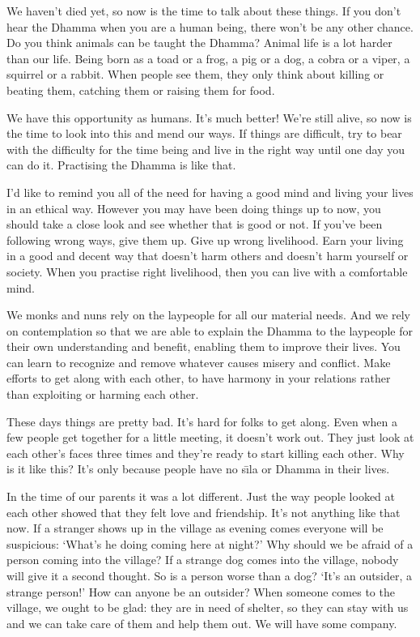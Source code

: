 We haven't died yet, so now is the time to talk about these things. If you don't hear the Dhamma when you are a human being, there won't be any other chance. Do you think animals can be taught the Dhamma? Animal life is a lot harder than our life. Being born as a toad or a frog, a pig or a dog, a cobra or a viper, a squirrel or a rabbit. When people see them, they only think about killing or beating them, catching them or raising them for food. 

We have this opportunity as humans. It's much better! We're still alive, so now is the time to look into this and mend our ways. If things are difficult, try to bear with the difficulty for the time being and live in the right way until one day you can do it. Practising the Dhamma is like that. 

I'd like to remind you all of the need for having a good mind and living your lives in an ethical way. However you may have been doing things up to now, you should take a close look and see whether that is good or not. If you've been following wrong ways, give them up. Give up wrong livelihood. Earn your living in a good and decent way that doesn't harm others and doesn't harm yourself or society. When you practise right livelihood, then you can live with a comfortable mind. 

We monks and nuns rely on the laypeople for all our material needs. And we rely on contemplation so that we are able to explain the Dhamma to the laypeople for their own understanding and benefit, enabling them to improve their lives. You can learn to recognize and remove whatever causes misery and conflict. Make efforts to get along with each other, to have harmony in your relations rather than exploiting or harming each other. 

These days things are pretty bad. It's hard for folks to get along. Even when a few people get together for a little meeting, it doesn't work out. They just look at each other's faces three times and they're ready to start killing each other. Why is it like this? It's only because people have no s\={\i}la or Dhamma in their lives. 

In the time of our parents it was a lot different. Just the way people looked at each other showed that they felt love and friendship. It's not anything like that now. If a stranger shows up in the village as evening comes everyone will be suspicious: `What's he doing coming here at night?' Why should we be afraid of a person coming into the village? If a strange dog comes into the village, nobody will give it a second thought. So is a person worse than a dog? `It's an outsider, a strange person!' How can anyone be an outsider? When someone comes to the village, we ought to be glad: they are in need of shelter, so they can stay with us and we can take care of them and help them out. We will have some company. 

